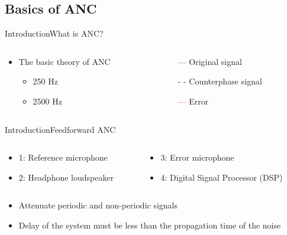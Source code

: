\subsection{Basics of ANC}
\begin{frame}{Introduction}{What is ANC?}
	\begin{columns}
		\begin{column}{0.5\textwidth}
				\begin{itemize}
					\item The basic theory of ANC
					\begin{itemize}
						\item  250 Hz
						\item 2500 Hz 
					\end{itemize}	
				\end{itemize}
			\vspace{-2.5mm}	
		\begin{center}
	 		
	 	\end{center}
		\end{column}
		\begin{column}{0.5\textwidth} 
			\begin{itemize}
				\item[\textcolor{MATLABblue}{---}] Original signal
				\item[\textcolor{MATLABblue}{- -}] Counterphase signal
				\item[\textcolor{red}{---}] Error
			\end{itemize}
		\begin{center}
	 		
	 	\end{center}
		\end{column}
	\end{columns}
\end{frame}

\begin{frame}{Introduction}{Feedforward ANC}
	\begin{columns}	
			\begin{column}{0.5\textwidth}
			\begin{itemize}
			\item 1: Reference microphone
			\item 2: Headphone loudspeaker
			\end{itemize}
			\end{column}		
	\begin{column}{0.5\textwidth} 
	\begin{itemize}
			\item 3: Error microphone
			\item 4: Digital Signal Processor (DSP)
	\end{itemize}
	\end{column}	
	\end{columns}	
	
	\begin{itemize}
			\item Attenuate periodic and non-periodic signals
			\item Delay of the system must be less than the propagation time of the noise
	\end{itemize}		
\end{frame}

